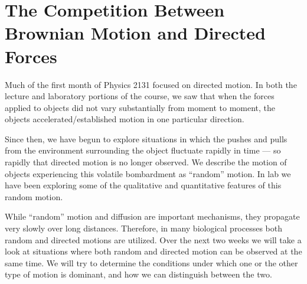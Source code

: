 \chapter{The Competition Between Brownian Motion and Directed Forces}
\thispagestyle{fancy}

Much of the first month of Physics 2131 focused on directed motion.
In both the lecture and laboratory portions of the course, we saw that when the forces applied to objects did not vary substantially from moment to moment, the objects accelerated/established motion in one particular direction.
\par
Since then, we have begun to explore situations in which the pushes and pulls from the environment surrounding the object fluctuate rapidly in time — so rapidly that directed motion is no longer observed. 
We describe the motion of objects experiencing this volatile bombardment as ``random'' motion. 
In lab we have been exploring some of the qualitative and quantitative features of this random motion.
\par
While ``random'' motion and diffusion are important mechanisms, they propagate very slowly over long distances. 
Therefore, in many biological processes both random and directed motions are utilized. 
Over the next two weeks we will take a look at situations where both random and directed motion can be observed at the same time. 
We will try to determine the conditions under which one or the other type of motion is dominant, and how we can distinguish between the two.

